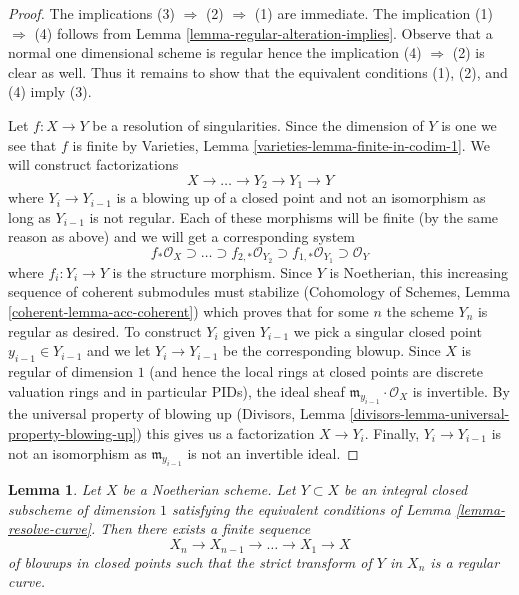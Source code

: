 \documentclass{stacks-project}
\theoremstyle{plain}
\newtheorem{lemma}[subsection]{Lemma}
\theoremstyle{definition}
\theoremstyle{remark}
\numberwithin{equation}{subsection}
\begin{document}
\begin{proof}
The implications (3) $\Rightarrow$ (2) $\Rightarrow$ (1) are immediate.
The implication (1) $\Rightarrow$ (4) follows from
Lemma \ref{lemma-regular-alteration-implies}.
Observe that a normal one dimensional scheme is regular hence
the implication (4) $\Rightarrow$ (2) is clear as well.
Thus it remains to show that the equivalent conditions (1), (2), and
(4) imply (3).

\medskip\noindent
Let $f : X \to Y$ be a resolution of singularities. Since the dimension
of $Y$ is one we see that $f$ is finite by
Varieties, Lemma \ref{varieties-lemma-finite-in-codim-1}.
We will construct factorizations
$$
X \to \ldots \to Y_2 \to Y_1 \to Y
$$
where $Y_i \to Y_{i - 1}$ is a blowing up of a closed point and not
an isomorphism as long as $Y_{i - 1}$ is not regular.
Each of these morphisms will be finite (by the same
reason as above) and we will get a corresponding system
$$
f_*\mathcal{O}_X \supset \ldots \supset
f_{2, *}\mathcal{O}_{Y_2} \supset
f_{1, *}\mathcal{O}_{Y_1} \supset \mathcal{O}_Y
$$
where $f_i : Y_i \to Y$ is the structure morphism.
Since $Y$ is Noetherian, this increasing sequence of coherent submodules
must stabilize
(Cohomology of Schemes, Lemma \ref{coherent-lemma-acc-coherent})
which proves that for some $n$ the scheme $Y_n$ is regular
as desired. To construct $Y_i$ given $Y_{i - 1}$ we pick a singular
closed point $y_{i - 1} \in Y_{i - 1}$ and we let $Y_i \to Y_{i - 1}$
be the corresponding blowup. Since $X$ is regular of dimension $1$
(and hence the local rings at closed points are discrete valuation
rings and in particular PIDs), the ideal sheaf
$\mathfrak m_{y_{i - 1}} \cdot \mathcal{O}_X$ is invertible.
By the universal property of blowing up (Divisors, Lemma
\ref{divisors-lemma-universal-property-blowing-up})
this gives us a factorization
$X \to Y_i$.
Finally, $Y_i \to Y_{i - 1}$ is not an isomorphism as
$\mathfrak m_{y_{i - 1}}$ is not an invertible ideal.
\end{proof}

\begin{lemma}
\label{lemma-blowup-curve}
Let $X$ be a Noetherian scheme. Let $Y \subset X$ be an integral closed
subscheme of dimension $1$ satisfying the equivalent conditions of
Lemma \ref{lemma-resolve-curve}. Then there exists a finite sequence
$$
X_n \to X_{n - 1} \to \ldots \to X_1 \to X
$$
of blowups in closed points such that the strict transform of $Y$
in $X_n$ is a regular curve.
\end{lemma}
\end{document}
